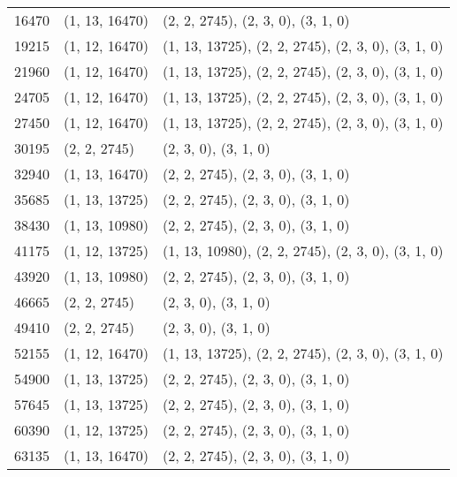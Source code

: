 \begin{longtable}{@{\extracolsep{\fill}}lll}
  16470              & (1, 13, 16470)              & (2, 2, 2745), (2, 3, 0), (3, 1, 0)                  \\
  19215              & (1, 12, 16470)              & (1, 13, 13725), (2, 2, 2745), (2, 3, 0), (3, 1, 0)  \\
  21960              & (1, 12, 16470)              & (1, 13, 13725), (2, 2, 2745), (2, 3, 0), (3, 1, 0)  \\
  24705              & (1, 12, 16470)              & (1, 13, 13725), (2, 2, 2745), (2, 3, 0), (3, 1, 0)  \\
  27450              & (1, 12, 16470)              & (1, 13, 13725), (2, 2, 2745), (2, 3, 0), (3, 1, 0)  \\
  30195              & (2, 2, 2745)                & (2, 3, 0), (3, 1, 0)                                \\
  32940              & (1, 13, 16470)              & (2, 2, 2745), (2, 3, 0), (3, 1, 0)                  \\
  35685              & (1, 13, 13725)              & (2, 2, 2745), (2, 3, 0), (3, 1, 0)                  \\
  38430              & (1, 13, 10980)              & (2, 2, 2745), (2, 3, 0), (3, 1, 0)                  \\
  41175              & (1, 12, 13725)              & (1, 13, 10980), (2, 2, 2745), (2, 3, 0), (3, 1, 0)  \\
  43920              & (1, 13, 10980)              & (2, 2, 2745), (2, 3, 0), (3, 1, 0)                  \\
  46665              & (2, 2, 2745)                & (2, 3, 0), (3, 1, 0)                                \\
  49410              & (2, 2, 2745)                & (2, 3, 0), (3, 1, 0)                                \\
  52155              & (1, 12, 16470)              & (1, 13, 13725), (2, 2, 2745), (2, 3, 0), (3, 1, 0)  \\
  54900              & (1, 13, 13725)              & (2, 2, 2745), (2, 3, 0), (3, 1, 0)                  \\
  57645              & (1, 13, 13725)              & (2, 2, 2745), (2, 3, 0), (3, 1, 0)                  \\
  60390              & (1, 12, 13725)              & (2, 2, 2745), (2, 3, 0), (3, 1, 0)                  \\
  63135              & (1, 13, 16470)              & (2, 2, 2745), (2, 3, 0), (3, 1, 0)                  \\

\end{longtable}
